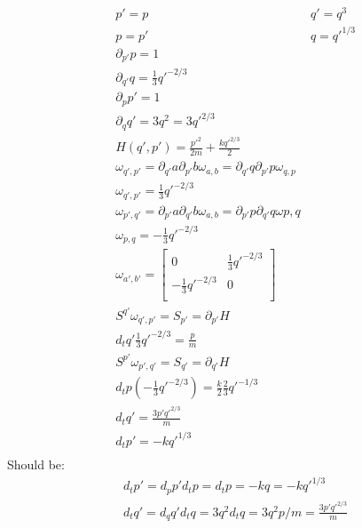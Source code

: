\documentclass[aps,pra,10pt,twocolumn,floatfix,nofootinbib]{revtex4-1}
\theoremstyle{definition}
\begin{document}
\begin{align*}
&p' = p &q' = q^3 \\
&p = p' &q = q'^{1/3} \\
&\partial_{p'}p=1 \\
&\partial_{q'}q=\frac{1}{3}q'^{-2/3} \\
&\partial_{p}p'=1 \\
&\partial_{q}q'=3q^2=3q'^{2/3} \\
&H(q',p') = \frac{p'^2}{2m} + \frac{kq'^{2/3}}{2}  \\
&\omega_{q',p'} = \partial_{q'}a \partial_{p'}b \omega_{a,b} = \partial_{q'}q \partial_{p'}p \omega_{q,p} \\
&\omega_{q',p'} = \frac{1}{3}q'^{-2/3} \\
&\omega_{p',q'} = \partial_{p'}a \partial_{q'}b \omega_{a,b} = \partial_{p'}p \partial_{q'}q \omega{p,q} \\
&\omega_{p,q} = -\frac{1}{3}q'^{-2/3} \\
&\omega_{a', b'} =  \left[
  \begin{array}{cc}
    0 & \frac{1}{3}q'^{-2/3} \\
    -\frac{1}{3}q'^{-2/3} & 0 \\
  \end{array}
\right] \\
&S^{q'} \omega_{q', p'} = S_{p'} = \partial_{p'} H \\
&d_tq' \frac{1}{3}q'^{-2/3} = \frac{p}{m} \\
&S^{p'} \omega_{p', q'} = S_{q'} = \partial_{q'} H \\
&d_tp (-\frac{1}{3}q'^{-2/3}) = \frac{k}{2} \frac{2}{3} q'^{-1/3} \\
&d_tq' = \frac{3p'q'^{2/3}}{m} \\
&d_tp' = - k q'^{1/3} \\
\end{align*}
Should be:
\begin{align*}
&d_tp'=d_pp'd_tp=d_tp=-kq=-kq'^{1/3} \\
&d_tq'=d_qq'd_tq=3q^2d_tq=3q^2p/m=\frac{3p'q'^{2/3}}{m}
\end{align*}
\end{document}
